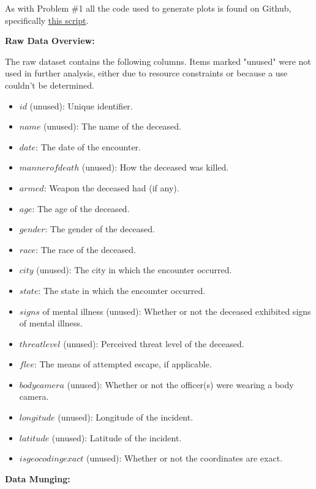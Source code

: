 \documentclass[12pt]{article}
\begin{document}
\begin{enumerate}[leftmargin=\labelsep]
  As with Problem \#1 all the code used to generate plots is found on Github, specifically \href{https://github.com/danielmohansahu/data-science-exercises/blob/main/hw1/analyze_shootings.py}{this script}.

  \textbf{Raw Data Overview:}

  The raw dataset contains the following columns. Items marked "unused" were not used in further analysis, either due to resource constraints
  or because a use couldn't be determined.

  \begin{itemize}
    \item $id$ (unused): Unique identifier.
    \item $name$ (unused): The name of the deceased.
    \item $date$: The date of the encounter.
    \item $manner of death$ (unused): How the deceased was killed.
    \item $armed$: Weapon the deceased had (if any).
    \item $age$: The age of the deceased.
    \item $gender$: The gender of the deceased.
    \item $race$: The race of the deceased.
    \item $city$ (unused): The city in which the encounter occurred.
    \item $state$: The state in which the encounter occurred.
    \item $signs$ of mental illness (unused): Whether or not the deceased exhibited signs of mental illness.
    \item $threat level$ (unused): Perceived threat level of the deceased.
    \item $flee$: The means of attempted escape, if applicable.
    \item $body camera$ (unused): Whether or not the officer(s) were wearing a body camera.
    \item $longitude$ (unused): Longitude of the incident.
    \item $latitude$ (unused): Latitude of the incident.
    \item $is geocoding exact$ (unused): Whether or not the coordinates are exact.
  \end{itemize}

  \textbf{Data Munging:}


\end{enumerate}
\end{document}
